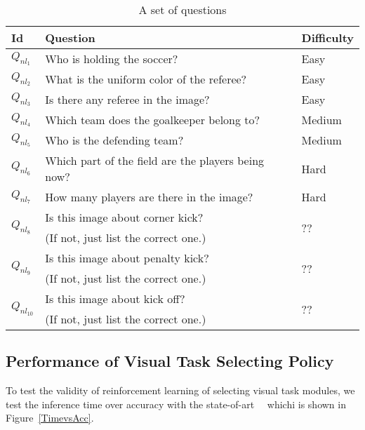 \begin{table}[thb] 
\footnotesize
\begin{tabular}{|l|l|l|}
\hline
Id & Question                                           & Difficulty \\ \hline
$Q_{nl_1}$  & Who is holding the soccer?                         & Easy       \\ \hline
$Q_{nl_2}$  & What is the uniform color of the referee?           & Easy       \\ \hline
$Q_{nl_3}$  & Is there any referee in the image?                 & Easy       \\ \hline
$Q_{nl_4}$  & Which team does the goalkeeper belong to?          & Medium       \\ \hline
$Q_{nl_5}$  & Who is the defending team?                         & Medium       \\ \hline
$Q_{nl_6}$  & Which part of the field are the players being now? & Hard       \\ \hline
$Q_{nl_7}$  & How many players are there in the image?           & Hard     \\ \hline

\multirow{2}{*}{$Q_{nl_8}$ }
 & Is this image about corner kick?           &  \multirow{2}{*}{\color{red}??}  \\ 
 & {\color{red}(If not, just list the correct one.)}  & \\ \hline
 
\multirow{2}{*}{$Q_{nl_9}$}  &   Is this image about penalty kick?  &  \multirow{2}{*}{\color{red}??}    \\ 
 & {\color{red}(If not, just list the correct one.)}  &  \\ \hline
 
\multirow{2}{*}{$Q_{nl_{10}}$}  &  Is this image about kick off?  &  \multirow{2}{*}{\color{red}??}    \\ 
 & {\color{red}(If not, just list the correct one.)}  &  \\ \hline
 
\end{tabular} 
\caption{A set of questions} \label{table:questions}
\end{table}




\subsection{Performance of Visual Task Selecting Policy }
To test the validity of reinforcement learning of selecting visual task modules, we test the inference time over accuracy with the state-of-art~\cite{VQA}~\cite{Lu2016Hie} whichi is shown in Figure~\ref{TimevsAcc}.

